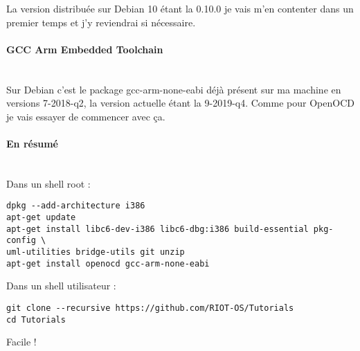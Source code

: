 La version distribuée sur Debian 10 étant la 0.10.0 je vais m'en contenter dans un
premier temps et j'y reviendrai si nécessaire.

\paragraph{GCC Arm Embedded Toolchain}~\\

Sur Debian c'est le package gcc-arm-none-eabi déjà présent sur ma machine en versions
7-2018-q2, la version actuelle étant la 9-2019-q4. Comme pour OpenOCD je vais essayer
de commencer avec ça.

\paragraph{En résumé}~\\

Dans un shell root :
\begin{verbatim}
dpkg --add-architecture i386
apt-get update
apt-get install libc6-dev-i386 libc6-dbg:i386 build-essential pkg-config \
uml-utilities bridge-utils git unzip
apt-get install openocd gcc-arm-none-eabi
\end{verbatim}
Dans un shell utilisateur :
\begin{verbatim}
git clone --recursive https://github.com/RIOT-OS/Tutorials
cd Tutorials
\end{verbatim}

Facile !

